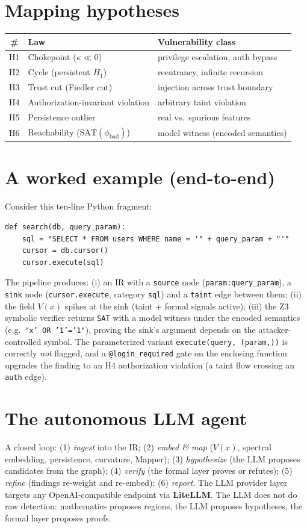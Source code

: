 \documentclass[11pt]{article}
\begin{document}
\section{Mapping hypotheses}
\begin{center}
\begin{tabular}{cll}
\toprule
\# & Law & Vulnerability class \\
\midrule
H1 & Chokepoint ($\kappa \ll 0$) & privilege escalation, auth bypass \\
H2 & Cycle (persistent $H_1$) & reentrancy, infinite recursion \\
H3 & Trust cut (Fiedler cut) & injection across trust boundary \\
H4 & Authorization-invariant violation & arbitrary taint violation \\
H5 & Persistence outlier & real vs.\ spurious features \\
H6 & Reachability ($\mathrm{SAT}(\phi_{\text{bad}})$) & model witness (encoded semantics) \\
\bottomrule
\end{tabular}
\end{center}

\section{A worked example (end-to-end)}
Consider this ten-line Python fragment:
\begin{lstlisting}
def search(db, query_param):
    sql = "SELECT * FROM users WHERE name = '" + query_param + "'"
    cursor = db.cursor()
    cursor.execute(sql)
\end{lstlisting}
The pipeline produces: (i) an IR with a \texttt{source} node
(\texttt{param:query\_param}), a \texttt{sink} node (\texttt{cursor.execute},
category \texttt{sql}) and a \texttt{taint} edge between them; (ii) the field
$V(x)$ spikes at the sink (taint + formal signals active); (iii) the Z3 symbolic
verifier returns \texttt{SAT} with a model witness under the encoded semantics (e.g.\
\texttt{"x' OR '1'='1"}), proving the sink's argument depends on
the attacker-controlled symbol. The parameterized variant
\texttt{execute(query, (param,))} is correctly \emph{not} flagged, and a
\texttt{@login\_required} gate on the enclosing function upgrades the finding to
an H4 authorization violation (a taint flow crossing an \texttt{auth} edge).

\section{The autonomous LLM agent}
A closed loop: (1) \emph{ingest} into the IR; (2) \emph{embed \& map} ($V(x)$,
spectral embedding, persistence, curvature, Mapper); (3) \emph{hypothesize}
(the LLM proposes candidates from the graph); (4) \emph{verify} (the formal
layer proves or refutes); (5) \emph{refine} (findings re-weight and re-embed);
(6) \emph{report}. The LLM provider layer targets any OpenAI-compatible endpoint
via \textbf{LiteLLM}. The LLM does not do raw detection: mathematics proposes
regions, the LLM proposes hypotheses, the formal layer proposes proofs.
\end{document}
